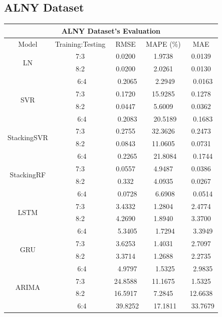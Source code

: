 \documentclass{ieeeojies}
\begin{document}
\subsection{ALNY Dataset} 
\begin{table}[H]
    \centering
    \begin{tabular}{|c|c|c|c|c|}
         \hline
         \multicolumn{5}{|c|}{\textbf{ALNY Dataset's Evaluation}}\\
         \hline
         \centering Model & Training:Testing & RMSE & MAPE (\%) & MAE\\
         \hline
         \multirow{2}{*}{LN} & 7:3 & 0.0200 & 1.9738 & 0.0139 \\ & 8:2 & 0.0200 & 2.0261 & 0.0130 \\ & \ 6:4} & \ 0.2065 & \ 2.2949 & \ 0.0163\\
         \hline
         \multirow{2}{*}{SVR} & 7:3 & 0.1720 & 15.9285 & 0.1278 \\ & 8:2 & 0.0447 & 5.6009 & 0.0362 \\ & \ 6:4} & \ 0.2083 & \ 20.5189 & \ 0.1683\\
         \hline
         \multirow{2}{*}{StackingSVR} & 7:3 & 0.2755 & 32.3626 & 0.2473 \\ & 8:2 & 0.0843 & 11.0605 & 0.0731 \\ & \ 6:4} & \ 0.2265 & \ 21.8084 & \ 0.1744\\
          \hline
        \multirow{2}{*}{StackingRF} & 7:3 & 0.0557 & 4.9487 & 0.0386 \\ & 8:2 & 0.332 & 4.0935 & 0.0267 \\ & \ 6:4} & \ 0.0728 & \ 6.6908 & \ 0.0514\\
        \hline
         \multirow{2}{*}{LSTM} & 7:3 & 3.4332 & 1.2804 & 2.4774 \\ & 8:2 & 4.2690 & 1.8940 & 3.3700 \\ & \ 6:4} & \ 5.3405 & \ 1.7294 & \ 3.3949\\
         \hline
         \multirow{2}{*}{GRU} & 7:3 & 3.6253 & 1.4031 & 2.7097 \\ & 8:2 & 3.3714 & 1.2688 & 2.2735 \\ & \ 6:4} & \ 4.9797 & \ 1.5325 & \ 2.9835\\
         \hline
         \multirow{2}{*}{ARIMA} & 7:3 & 24.8588 & 11.1675 & 1.5325 \\ & 8:2 & 16.5917 & 7.2845 & 12.6638 \\ & \ 6:4} & \ 39.8252 & \ 17.1811 & \ 33.7679\\
         \hline

\end{tabular}
\end{table}
\end{document}
